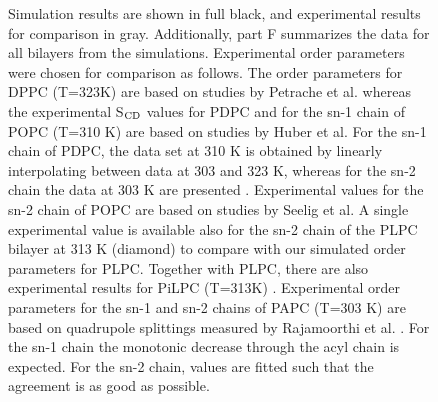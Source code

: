 \documentclass[aps,prl,superscriptaddress,twocolumn]{revtex4}
\begin{document}
\begin{figure}[]
{   Simulation results are shown in full black, and experimental results
   for comparison in gray. Additionally, part F summarizes the data for
   all bilayers from the simulations. Experimental order parameters were
   chosen for comparison as follows. The order parameters for DPPC (T=323K) 
   are based on studies by Petrache et al. \cite{petrache??} whereas the
   experimental S$_{{\rm CD}}$ values for PDPC and for the sn-1 chain of POPC (T=310 K) 
   are based on studies by Huber et al. \cite{huber??} For the sn-1 chain of
   PDPC, the data set at 310 K is obtained by linearly interpolating
   between data at 303 and 323 K, whereas for the sn-2 chain the data at
   303 K are presented \cite{??}. Experimental values for the sn-2 chain of POPC
   are based on studies by Seelig et al. \cite{seelig??} A single experimental value is
   available also for the sn-2 chain of the PLPC bilayer at 313 K
   (diamond) \cite{??} to compare with our simulated order parameters for PLPC.
   Together with PLPC, there are also experimental results for PiLPC (T=313K) \cite{??}. 
   Experimental order parameters for the sn-1 and sn-2 chains
   of PAPC (T=303 K) are based on quadrupole splittings measured by
   Rajamoorthi et al. \cite{rajamoorthi??}. For the sn-1 chain the monotonic decrease through
   the acyl chain is expected. For the sn-2 chain, values are fitted such
   that the agreement is as good as possible.
  } 
\end{figure}
\end{document}
